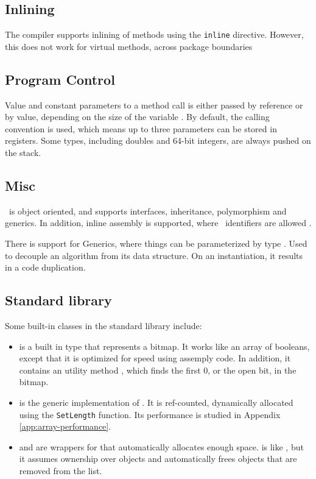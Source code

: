 \subsection{Inlining}
\label{sub:Inlining}
The compiler supports inlining of methods using the \texttt{inline} directive. However, this does not work for virtual methods, across package boundaries \cite{noauthor_undated-rx} 

\subsection{Program Control}
\label{sub:Program Control}
Value and constant parameters to a method call is either passed by reference or by value, depending on the size of the variable \cite{noauthor_undated-ae}. By default, the  calling convention is used, which means up to three parameters can be stored in registers. Some types, including doubles and 64-bit integers, are always pushed on the stack.

\subsection{Misc}
\label{sec:Misc}
\delphi~is object oriented, and supports interfaces, inheritance, polymorphism and generics. In addition, inline assembly is supported, where \delphi~identifiers are allowed \cite{noauthor_undated-px}.

There is support for Generics, where things can be parameterized by type \cite{noauthor_undated-sx}. Used to decouple an algorithm from its data structure. On an instantiation, it results in a code duplication.

\subsection{Standard library}
\label{sub:Standard library}
Some built-in classes in the standard library include:
\begin{itemize}
    \item {} is a built in type that represents a bitmap. It works like an array of booleans, except that it is optimized for speed using assemply code. In addition, it contains an utility method , which finds the first 0, or the open bit, in the bitmap.
    \item {} is the generic implementation of . It is ref-counted, dynamically allocated using the \texttt{SetLength} function. Its performance is studied in Appendix \ref{app:array-performance}.
    \item {} and  are wrappers for  that automatically allocates enough space.  is like , but it assumes ownership over objects and automatically frees objects that are removed from the list.
\end{itemize}

